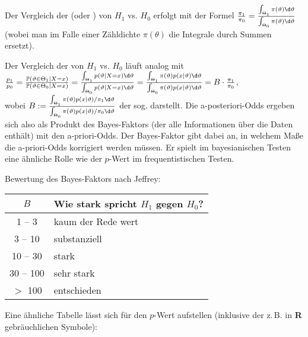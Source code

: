 \linie
\pagebreak

\begin{Bem}
    Der Vergleich der  (oder ) von $H_1$ vs. $H_0$
    erfolgt mit der Formel $\frac{\pi_1}{\pi_0}
    = \frac{\int_{\Theta_1} \pi(\theta)\d\theta}{\int_{\Theta_0} \pi(\theta)\d\theta}$
    (wobei man im Falle einer Zähldichte $\pi(\theta)$ die Integrale durch Summen ersetzt).
    
    Der Vergleich der  von $H_1$ vs. $H_0$ läuft analog mit\\
    $\frac{p_1}{p_0} = \frac{\PP(\theta \in \Theta_1|X=x)}{\PP(\theta \in \Theta_0|X=x)}
    = \frac{\int_{\Theta_1} p(\theta|X=x)\d\theta}
    {\int_{\Theta_0} p(\theta|X=x)\d\theta}
    = \frac{\int_{\Theta_1} \pi(\theta)p(x|\theta)\d\theta}
    {\int_{\Theta_0} \pi(\theta)p(x|\theta)\d\theta} = B \cdot \frac{\pi_1}{\pi_0}$,\\
    wobei $B := \frac{\int_{\Theta_1} \pi(\theta)p(x|\theta)/\pi_1\d\theta}
    {\int_{\Theta_0} \pi(\theta)p(x|\theta)/\pi_0\d\theta}$ der sog. 
    darstellt.
    Die a-posteriori-Odds ergeben sich also als Produkt des Bayes-Faktors
    (der alle Informationen über die Daten enthält) mit den a-priori-Odds.
    Der Bayes-Faktor gibt dabei an, in welchem Maße die a-priori-Odds korrigiert werden müssen.
    Er spielt im bayesianischen Testen eine ähnliche Rolle wie der $p$-Wert im frequentistischen
    Testen.
    
    Bewertung des Bayes-Faktors nach Jeffrey:
    
    \begin{tabular}{cl}
        \toprule
        \textbf{$B$} & \textbf{Wie stark spricht $H_1$ gegen $H_0$?}\\
        \midrule
        1 -- 3 & kaum der Rede wert\\
        \midrule
        3 -- 10 & substanziell\\
        \midrule
        10 -- 30 & stark\\
        \midrule
        30 -- 100 & sehr stark\\
        \midrule
        $>$ 100 & entschieden\\
        \bottomrule
    \end{tabular}
    
    Eine ähnliche Tabelle lässt sich für den $p$-Wert aufstellen
    (inklusive der z.\,B. in \textbf{R} gebräuchlichen Symbole):
    

\end{Bem}
